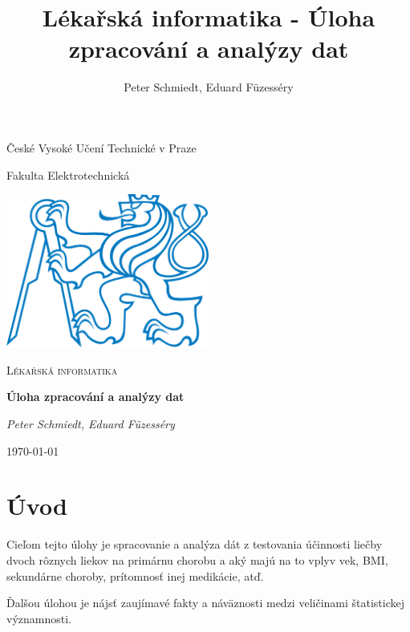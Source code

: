 \documentclass[11pt, a4paper]{article}
\author{Peter Schmiedt, Eduard Füzesséry}
\title{Lékařská informatika - Úloha zpracování a analýzy dat}
\begin{document}

\begin{titlepage}

	\centering
	{\huge České Vysoké Učení Technické v Praze \par}
	\vspace{0.5cm}
	{\Large Fakulta Elektrotechnická \par}
	\vspace{1cm}
	\includegraphics[width=0.5\textwidth]{cvut}\par\vspace{1cm}
	\vspace{1cm}
	{\scshape\Large Lékařská informatika\par}
	{\huge\bfseries Úloha zpracování a analýzy dat\par}
	\vspace{2cm}
	{\Large\itshape Peter Schmiedt, Eduard Füzesséry\par}
	\vfill

	{\large \today\par}

\end{titlepage}


\section{Úvod}
Cieľom tejto úlohy je spracovanie a analýza dát z testovania účinnosti liečby dvoch rôznych liekov na primárnu chorobu a aký majú na to vplyv vek, BMI, sekundárne choroby, prítomnosť inej medikácie, atď.


Ďalšou úlohou je nájsť zaujímavé fakty a náväznosti medzi veličinami štatistickej významnosti.









{}


\appendix


\end{document}

